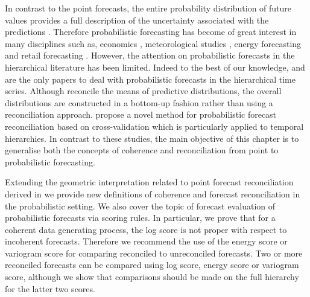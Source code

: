 \documentclass[12pt]{article}
\theoremstyle{definition}
\begin{document}

In contrast to the point forecasts, the entire probability distribution of future values provides a full description of the uncertainty associated with the predictions \citep{Abramson1995, Gneiting2014}. Therefore probabilistic forecasting has become of great interest in many disciplines such as, economics \citep{zarnowitz1987, rossi2014}, meteorological studies \citep{pinson2009, mclean2013}, energy forecasting \citep{wytock2013, BenTaieb2017} and retail forecasting \citep{bose2017}. However, the attention on probabilistic forecasts in the hierarchical literature has been limited. Indeed to the best of our knowledge, \citet{Taieb2017} and \citet{JeoEtAl2019} are the only papers to deal with probabilistic forecasts in the hierarchical time series. Although \citet{Taieb2017} reconcile the means of predictive distributions, the overall distributions are constructed in a bottom-up fashion rather than using a reconciliation approach. \citet{JeoEtAl2019} propose a novel method for probabilistic forecast reconciliation based on cross-validation which is particularly applied to temporal hierarchies. In contrast to these studies, the main objective of this chapter is to generalise both the concepts of coherence and reconciliation from point to probabilistic forecasting.



Extending the geometric interpretation related to point forecast reconciliation derived in \citep{PanEtAl2019HF} we provide new definitions of coherence and forecast reconciliation in the probabilistic setting. We also cover the topic of forecast evaluation of probabilistic forecasts via scoring rules. In particular, we prove that for a coherent data generating process, the log score is not proper with respect to incoherent forecasts. Therefore we recommend the use of the energy score or variogram score for comparing reconciled to unreconciled forecasts. Two or more reconciled forecasts can be compared using log score, energy score or variogram score, although we show that comparisons should be made on the full hierarchy for the latter two scores.
\end{document}
